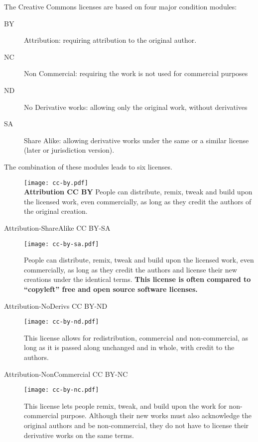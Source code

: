 The Creative Commons licenses are based on four major condition modules:
\begin{description}
    \item[BY] Attribution: requiring attribution to the original author.
    \item[NC] Non Commercial: requiring the work is not used for commercial purposes
    \item[ND] No Derivative works: allowing only the original work, without derivatives
    \item[SA] Share Alike: allowing derivative works under the same or a similar license (later or jurisdiction version).
\end{description}


The combination of these modules leads to six licenses.

\begin{description}
    \item[] \texttt{[image: cc-by.pdf]} \\ \textbf{Attribution CC BY} People can distribute, remix, tweak and build upon the licensed work, even commercially, as long as they credit the authors of the original creation.
    \item[Attribution-ShareAlike CC BY-SA] \begin{center} \texttt{[image: cc-by-sa.pdf]} \end{center} People can distribute, remix, tweak and build upon the licensed work, even commercially, as long as they credit the authors and license their new creations under the identical terms.
    \textbf{This license is often compared to “copyleft” free and open source software licenses.}
    \item[Attribution-NoDerivs CC BY-ND] \begin{center} \texttt{[image: cc-by-nd.pdf]} \end{center} This license allows for redistribution, commercial and non-commercial, as long as it is passed along unchanged and in whole, with credit to the authors.
    \item[Attribution-NonCommercial CC BY-NC] \begin{center} \texttt{[image: cc-by-nc.pdf]} \end{center} This license lets people remix, tweak, and build upon the work for non-commercial purpose.
    Although their new works must also acknowledge the original authors and be non-commercial, they do not have to license their derivative works on the same terms.

\end{description}
